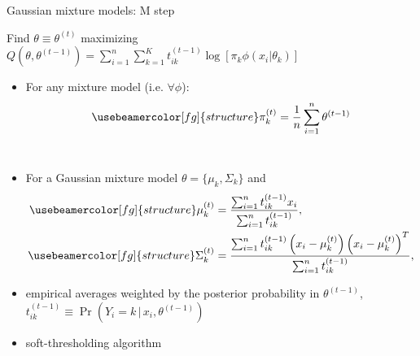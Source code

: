 \documentclass[compress, smaller, serif, 9pt]{beamer}
\newcommand{\structuretext}[1]{{\usebeamercolor[fg]{structure} #1}}
\newcommand{\doigt}{\structuretext{\noindent \Pisymbol{pzd}{43}}}
\begin{document}
\begin{frame}{Gaussian mixture models: M step}

Find $\theta\equiv\theta^{(t)}$ maximizing 
$Q\left(\theta,\theta^{(t-1)} \right) = \sum_{i=1}^n \sum_{k=1}^K t_{ik}^{(t-1)} \log{\left[ \pi_k \phi(x_i|\theta_k) \right]}$

\begin{itemize}
  \item For any mixture model (i.e. $\forall \phi$): \vspace{-2mm}
  $$
   \structuretext{ \pi_k^{(t)} }= \frac{1}{n} \sum_{i=1}^n \theta^{(t-1)}
  $$\vspace{-4mm}\\
  \item For a Gaussian mixture model $\theta=\{\mu_k,\Sigma_k\}$ and 
  \begin{align*}
   \structuretext{ \mu_k^{(t)} } &= \frac{ \sum_{i=1}^n t_{ik}^{(t-1)} x_i }{\sum_{i=1}^n t_{ik}^{(t-1)}},\\
   \structuretext{ \Sigma_k^{(t)} } &= \frac{ \sum_{i=1}^n t_{ik}^{(t-1)} \left( x_i -\mu_k^{(t)} \right) \left( x_i -\mu_k^{(t)} \right)^T }
   {\sum_{i=1}^n t_{ik}^{(t-1)}},
  \end{align*}
  \item empirical averages weighted by the posterior probability in $\theta^{(t-1)}$,  $t_{ik}^{(t-1)} \equiv \Pr{\left(Y_i=k\,|\, x_i,\theta^{(t-1)} \right) }$ 
  \item[\doigt] \structuretext{soft-thresholding} algorithm
 \end{itemize}




\end{frame}
\end{document}
